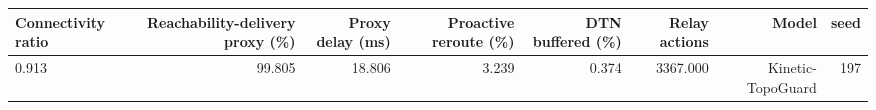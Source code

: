 \begin{tabular}{lrrrrrrr}
\toprule
Connectivity ratio & Reachability-delivery proxy (\%) & Proxy delay (ms) & Proactive reroute (\%) & DTN buffered (\%) & Relay actions & Model & seed \\
\midrule
0.913 & 99.805 & 18.806 & 3.239 & 0.374 & 3367.000 & Kinetic-TopoGuard & 197 \\
\bottomrule
\end{tabular}